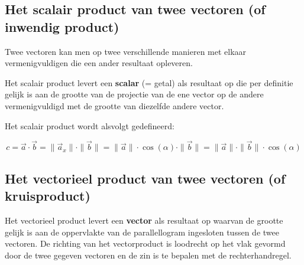 \documentclass{ximera}
\begin{document}
\subsection*{Het scalair product van twee vectoren (of inwendig product)}

Twee vectoren kan men op twee verschillende manieren met elkaar vermenigvuldigen die een ander resultaat opleveren. 

Het scalair product levert een \textbf{scalar} (= getal) als resultaat op die per definitie gelijk is aan de grootte van de projectie van de ene vector op de andere vermenigvuldigd met de grootte van diezelfde andere vector. 

Het scalair product wordt alsvolgt gedefineerd: 

$$
c = \vec{a} \cdot \vec{b} = \| \vec{a}_x \| \cdot \|\vec{b}\| = \|\vec{a}\| \cdot \cos(\alpha) \cdot \|\vec{b}\| = \| \vec{a}\| \cdot \| \vec{b}\| \cdot \cos(\alpha)
$$

\begin{image}
\end{image}

\subsection*{Het vectorieel product van twee vectoren (of kruisproduct)}

Het vectorieel product levert een \textbf{vector} als resultaat op waarvan de grootte gelijk is aan de oppervlakte van de parallellogram ingesloten tussen de twee vectoren. 
De richting van het vectorproduct is loodrecht op het vlak gevormd door de twee gegeven vectoren en de zin is te bepalen met de rechterhandregel.
\end{document}

